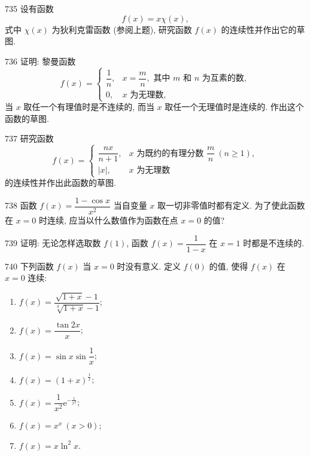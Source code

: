 \begin{prob}[M]{735}
设有函数
\[
f(x) = x\chi(x),
\]
式中 $\chi(x)$ 为狄利克雷函数 (参阅上题), 研究函数 $f(x)$ 的连续性并作出它的草图.
\end{prob}

\begin{prob}[L]{736}
证明: 黎曼函数
\[
f(x) = \begin{cases}
\dfrac{1}{n}, & x = \dfrac{m}{n}, \text{ 其中 } m \text{ 和 } n \text{ 为互素的数}, \\
0, & x \text{ 为无理数},
\end{cases}
\]
当 $x$ 取任一个有理值时是不连续的, 而当 $x$ 取任一个无理值时是连续的. 作出这个函数的草图.
\end{prob}

\begin{prob}[M]{737}
研究函数
\[
f(x) = \begin{cases}
\dfrac{nx}{n + 1}, & x \text{ 为既约的有理分数 } \dfrac{m}{n} \ (n \geqslant 1), \\
|x|, & x \text{ 为无理数}
\end{cases}
\]
的连续性并作出此函数的草图.
\end{prob}

\begin{prob}[S]{738}
函数 $f(x) = \dfrac{1 - \cos x}{x^2}$ 当自变量 $x$ 取一切非零值时都有定义. 为了使此函数在 $x = 0$ 时连续, 应当以什么数值作为函数在点 $x = 0$ 的值?
\end{prob}

\begin{prob}[M]{739}
证明: 无论怎样选取数 $f(1)$, 函数 $f(x) = \dfrac{1}{1 - x}$ 在 $x = 1$ 时都是不连续的.
\end{prob}

\begin{prob}[L]{740}
下列函数 $f(x)$ 当 $x = 0$ 时没有意义. 定义 $f(0)$ 的值, 使得 $f(x)$ 在 $x = 0$ 连续:
\begin{enumerate}[label=(\alph*), itemsep=2pt, topsep=3pt]
\item $f(x) = \dfrac{\sqrt{1 + x} - 1}{\sqrt[3]{1 + x} - 1}$;
\item $f(x) = \dfrac{\tan 2x}{x}$;
\item $f(x) = \sin x \sin \dfrac{1}{x}$;
\item $f(x) = (1 + x)^{\frac{1}{x}}$;
\item $f(x) = \dfrac{1}{x^2} \mathrm{e}^{-\frac{1}{x^2}}$;
\item $f(x) = x^x \ (x > 0)$;
\item $f(x) = x \ln^2 x$.
\end{enumerate}
\end{prob}

